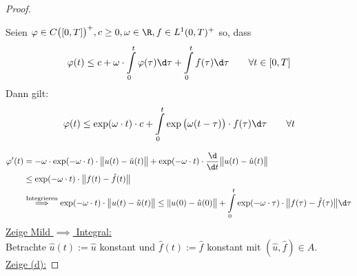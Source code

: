 \begin{proof}
\begin{lemma}[Gronwall]\label{lemmaGronwall}\enter
Seien $\varphi\in C\big([0,T]\big)^+,c\geq 0,\omega\in\R,f\in L^1(0,T)^+$ so, dass
\begin{align*}
\varphi(t)\leq c+\omega\cdot\int\limits_0^t\varphi(\tau)\d\tau+\int\limits_0^t f(\tau)\d\tau\qquad\forall t\in[0,T]
\end{align*}
Dann gilt:
\begin{align*}
\varphi(t)\leq\exp(\omega\cdot t)\cdot c+\int\limits_0^t\exp\big(\omega(t-\tau)\big)\cdot f(\tau)\d\tau\qquad\forall t
\end{align*}
\end{lemma}
\begin{align*}
\varphi'(t)&=-\omega\cdot\exp(-\omega\cdot t)\cdot\big\Vert u(t)-\hat{u}(t)\big\Vert
+\exp(-\omega\cdot t)\cdot\frac{\d}{\d t}\big\Vert u(t)-\hat{u}(t)\big\Vert\\
&\stackrel{}{\leq}
\exp(-\omega\cdot t)\cdot\big\Vert f(t)-\hat{f}(t)\big\Vert\\
&\stackrel{\text{Integrieren}}{\implies}
\exp(-\omega\cdot t)\cdot\big\Vert u(t)-\hat{u}(t)\big\Vert
\leq\Vert u(0)-\hat{u}(0)\big\Vert+\int\limits_0^t\exp(-\omega\cdot\tau)\cdot\big\Vert f(\tau)-\hat{f}(\tau)\big\Vert\d\tau
\end{align*}
\underline{Zeige Mild $\implies$ Integral:}\\
Betrachte $\hat{u}(t):=\hat{u}$ konstant und $\hat{f}(t):=\hat{f}$ konstant mit $(\hat{u},\hat{f})\in A$.\\

\underline{Zeige (d):}


\end{proof}
